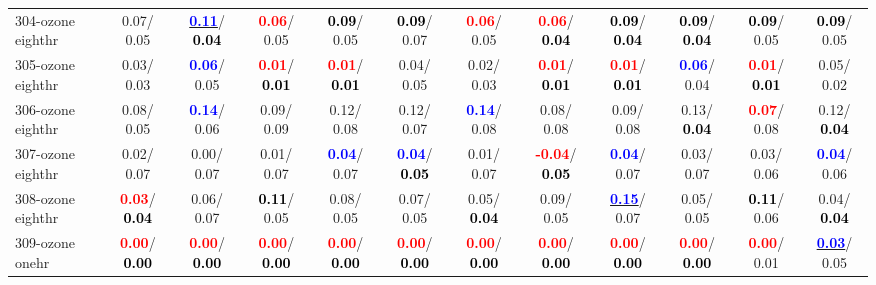 \begin{table}[h]
\begin{center}
{\begin{tabular}{lc|c|c|c|c|c|c|c|c|c|c}
304-ozone eighthr &   0.07/  0.05 & \underline{\textcolor{blue}{\textbf{  0.11}}}/\textcolor{black}{\textbf{  0.04}} & \textcolor{red}{\textbf{  0.06}}/  0.05 & \textcolor{black}{\textbf{  0.09}}/  0.05 & \textcolor{black}{\textbf{  0.09}}/  0.07 & \textcolor{red}{\textbf{  0.06}}/  0.05 & \textcolor{red}{\textbf{  0.06}}/\textcolor{black}{\textbf{  0.04}} & \textcolor{black}{\textbf{  0.09}}/\textcolor{black}{\textbf{  0.04}} & \textcolor{black}{\textbf{  0.09}}/\textcolor{black}{\textbf{  0.04}} & \textcolor{black}{\textbf{  0.09}}/  0.05 & \textcolor{black}{\textbf{  0.09}}/  0.05 \\
305-ozone eighthr &   0.03/  0.03 & \textcolor{blue}{\textbf{  0.06}}/  0.05 & \textcolor{red}{\textbf{  0.01}}/\textcolor{black}{\textbf{  0.01}} & \textcolor{red}{\textbf{  0.01}}/\textcolor{black}{\textbf{  0.01}} &   0.04/  0.05 &   0.02/  0.03 & \textcolor{red}{\textbf{  0.01}}/\textcolor{black}{\textbf{  0.01}} & \textcolor{red}{\textbf{  0.01}}/\textcolor{black}{\textbf{  0.01}} & \textcolor{blue}{\textbf{  0.06}}/  0.04 & \textcolor{red}{\textbf{  0.01}}/\textcolor{black}{\textbf{  0.01}} &   0.05/  0.02 \\
306-ozone eighthr &   0.08/  0.05 & \textcolor{blue}{\textbf{  0.14}}/  0.06 &   0.09/  0.09 &   0.12/  0.08 &   0.12/  0.07 & \textcolor{blue}{\textbf{  0.14}}/  0.08 &   0.08/  0.08 &   0.09/  0.08 &   0.13/\textcolor{black}{\textbf{  0.04}} & \textcolor{red}{\textbf{  0.07}}/  0.08 &   0.12/\textcolor{black}{\textbf{  0.04}} \\
307-ozone eighthr &   0.02/  0.07 &   0.00/  0.07 &   0.01/  0.07 & \textcolor{blue}{\textbf{  0.04}}/  0.07 & \textcolor{blue}{\textbf{  0.04}}/\textcolor{black}{\textbf{  0.05}} &   0.01/  0.07 & \textcolor{red}{\textbf{ -0.04}}/\textcolor{black}{\textbf{  0.05}} & \textcolor{blue}{\textbf{  0.04}}/  0.07 &   0.03/  0.07 &   0.03/  0.06 & \textcolor{blue}{\textbf{  0.04}}/  0.06 \\
308-ozone eighthr & \textcolor{red}{\textbf{  0.03}}/\textcolor{black}{\textbf{  0.04}} &   0.06/  0.07 & \textcolor{black}{\textbf{  0.11}}/  0.05 &   0.08/  0.05 &   0.07/  0.05 &   0.05/\textcolor{black}{\textbf{  0.04}} &   0.09/  0.05 & \underline{\textcolor{blue}{\textbf{  0.15}}}/  0.07 &   0.05/  0.05 & \textcolor{black}{\textbf{  0.11}}/  0.06 &   0.04/\textcolor{black}{\textbf{  0.04}} \\
309-ozone onehr & \textcolor{red}{\textbf{  0.00}}/\textcolor{black}{\textbf{  0.00}} & \textcolor{red}{\textbf{  0.00}}/\textcolor{black}{\textbf{  0.00}} & \textcolor{red}{\textbf{  0.00}}/\textcolor{black}{\textbf{  0.00}} & \textcolor{red}{\textbf{  0.00}}/\textcolor{black}{\textbf{  0.00}} & \textcolor{red}{\textbf{  0.00}}/\textcolor{black}{\textbf{  0.00}} & \textcolor{red}{\textbf{  0.00}}/\textcolor{black}{\textbf{  0.00}} & \textcolor{red}{\textbf{  0.00}}/\textcolor{black}{\textbf{  0.00}} & \textcolor{red}{\textbf{  0.00}}/\textcolor{black}{\textbf{  0.00}} & \textcolor{red}{\textbf{  0.00}}/\textcolor{black}{\textbf{  0.00}} & \textcolor{red}{\textbf{  0.00}}/  0.01 & \underline{\textcolor{blue}{\textbf{  0.03}}}/  0.05 \\ \hline

\end{tabular}}
\end{center}
\end{table}
